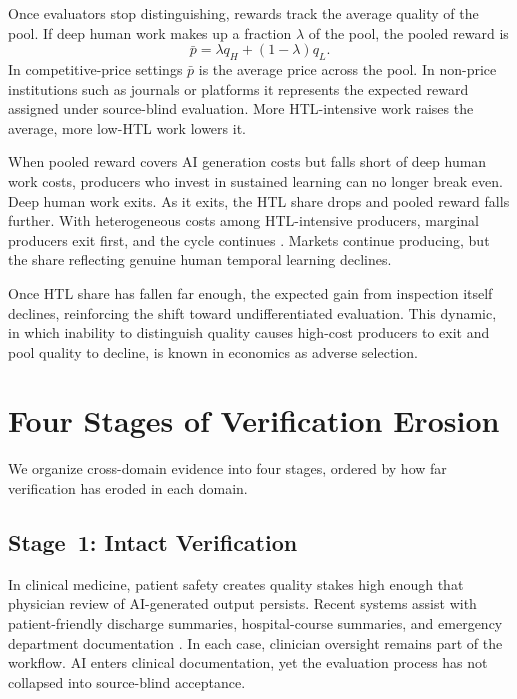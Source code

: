 \documentclass{article}
\theoremstyle{plain}
\theoremstyle{definition}
\theoremstyle{remark}
\begin{document}
\vspace{-1pt}

Once evaluators stop distinguishing, rewards track the average quality of the pool. If deep human work makes up a fraction $\lambda$ of the pool, the pooled reward is
\begin{equation}
\label{eq:pooled}
\bar{p} = \lambda q_H + (1-\lambda) q_L.
\end{equation}
In competitive-price settings $\bar{p}$ is the average price across the pool. In non-price institutions such as journals or platforms it represents the expected reward assigned under source-blind evaluation. More HTL-intensive work raises the average, more low-HTL work lowers it.

When pooled reward covers AI generation costs but falls short of deep human work costs, producers who invest in sustained learning can no longer break even. Deep human work exits. As it exits, the HTL share drops and pooled reward falls further. With heterogeneous costs among HTL-intensive producers, marginal producers exit first, and the cycle continues \citep{akerlof1970lemons}. Markets continue producing, but the share reflecting genuine human temporal learning declines.

Once HTL share has fallen far enough, the expected gain from inspection itself declines, reinforcing the shift toward undifferentiated evaluation. This dynamic, in which inability to distinguish quality causes high-cost producers to exit and pool quality to decline, is known in economics as adverse selection.





\section{Four Stages of Verification Erosion}
\label{sec:regimes}

We organize cross-domain evidence into four stages, ordered by how far verification has eroded in each domain.

\vspace{1pt}

\subsection{Stage~1: Intact Verification}
\label{sec:stage1}

In clinical medicine, patient safety creates quality stakes high enough that physician review of AI-generated output persists. Recent systems assist with patient-friendly discharge summaries, hospital-course summaries, and emergency department documentation \citep{zaretsky2024discharge, small2025hospitalcourse, song2025eddischarge}. In each case, clinician oversight remains part of the workflow. AI enters clinical documentation, yet the evaluation process has not collapsed into source-blind acceptance.
\end{document}
